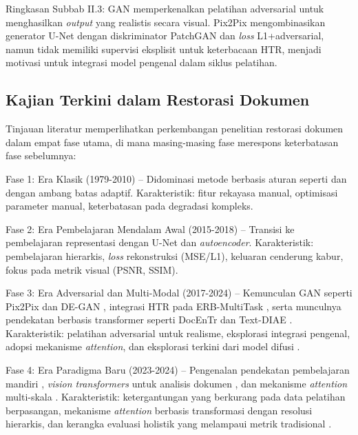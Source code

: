 Ringkasan Subbab II.3: GAN memperkenalkan pelatihan adversarial untuk menghasilkan \textit{output} yang realistis secara visual. Pix2Pix mengombinasikan generator U-Net dengan diskriminator PatchGAN dan \textit{loss} L1+adversarial, namun tidak memiliki supervisi eksplisit untuk keterbacaan HTR, menjadi motivasi untuk integrasi model pengenal dalam siklus pelatihan.


\subsection{Kajian Terkini dalam Restorasi Dokumen}
\label{subsec:sota-analysis}


Tinjauan literatur memperlihatkan perkembangan penelitian restorasi dokumen dalam empat fase utama, di mana masing-masing fase merespons keterbatasan fase sebelumnya:

Fase 1: Era Klasik (1979-2010) -- Didominasi metode berbasis aturan seperti \parencite{otsu1979} dan \parencite{sauvola2000} dengan ambang batas adaptif. Karakteristik: fitur rekayasa manual, optimisasi parameter manual, keterbatasan pada degradasi kompleks.

Fase 2: Era Pembelajaran Mendalam Awal (2015-2018) -- Transisi ke pembelajaran representasi dengan U-Net \parencite{ronneberger2015} dan \textit{autoencoder}. Karakteristik: pembelajaran hierarkis, \textit{loss} rekonstruksi (MSE/L1), keluaran cenderung kabur, fokus pada metrik visual (PSNR, SSIM).

Fase 3: Era Adversarial dan Multi-Modal (2017-2024) -- Kemunculan GAN seperti Pix2Pix \parencite{isola2017} dan DE-GAN \parencite{souibgui2021}, integrasi HTR pada ERB-MultiTask \parencite{erb2021}, serta munculnya pendekatan berbasis transformer seperti DocEnTr \parencite{docentr2022} dan Text-DIAE \parencite{textdiae2022}. Karakteristik: pelatihan adversarial untuk realisme, eksplorasi integrasi pengenal, adopsi mekanisme \textit{attention}, dan eksplorasi terkini dari model difusi \parencite{chen2024diffusion}.

Fase 4: Era Paradigma Baru (2023-2024) -- Pengenalan pendekatan pembelajaran mandiri \parencite{zhang2024}, \textit{vision transformers} untuk analisis dokumen \parencite{kiessling2023}, dan mekanisme \textit{attention} multi-skala \parencite{martinez2024}. Karakteristik: ketergantungan yang berkurang pada data pelatihan berpasangan, mekanisme \textit{attention} berbasis transformasi dengan resolusi hierarkis, dan kerangka evaluasi holistik yang melampaui metrik tradisional \parencite{thompson2023}.

